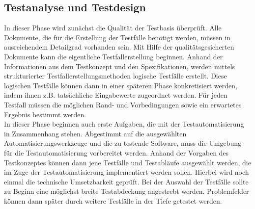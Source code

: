 \subsection{Testanalyse und Testdesign}
\label{subsec:testanalyse_und_design}
In dieser Phase wird zunächst die Qualität der Testbasis überprüft. Alle Dokumente, die für die Erstellung der Testfälle benötigt werden, müssen in ausreichendem Detailgrad vorhanden sein. Mit Hilfe der qualitätsgesicherten Dokumente kann die eigentliche Testfallerstellung beginnen.
Anhand der Informationen aus dem Testkonzept und den Spezifikationen, werden mittels strukturierter Testfallerstellungsmethoden logische Testfälle erstellt. Diese logischen Testfälle können dann in einer späteren Phase konkretisiert werden, indem ihnen z.B. tatsächliche Eingabewerte zugeordnet werden. Für jeden Testfall müssen die möglichen Rand- und Vorbedingungen sowie ein erwartetes Ergebnis bestimmt werden.\\
In dieser Phase beginnen auch erste Aufgaben, die mit der Testautomatisierung in Zusammenhang stehen.
Abgestimmt auf die ausgewählten Automatisierungswerkzeuge und die zu testende Software, muss die Umgebung für die Testautomatisierung vorbereitet werden. Anhand der Vorgaben des Testkonzeptes können dann jene Testfälle und Testabläufe ausgewählt werden, die im Zuge der Testautomatisierung implementiert werden sollen. Hierbei wird noch einmal die technische Umsetzbarkeit geprüft. Bei der Auswahl der Testfälle sollte zu Beginn eine möglichst breite Testabdeckung angestrebt werden.
Problemfelder können dann später durch weitere Testfälle in der Tiefe getestet werden.

